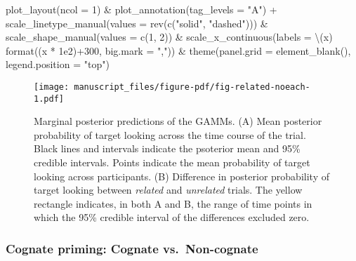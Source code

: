 \documentclass[
  letterpaper,
  DIV=11,
  numbers=noendperiod]{scrartcl}
\newenvironment{Shaded}{\begin{snugshade}}{\end{snugshade}}
\newcommand{\AttributeTok}[1]{\textcolor[rgb]{0.40,0.45,0.13}{#1}}
\newcommand{\DecValTok}[1]{\textcolor[rgb]{0.68,0.00,0.00}{#1}}
\newcommand{\FloatTok}[1]{\textcolor[rgb]{0.68,0.00,0.00}{#1}}
\newcommand{\FunctionTok}[1]{\textcolor[rgb]{0.28,0.35,0.67}{#1}}
\newcommand{\NormalTok}[1]{\textcolor[rgb]{0.00,0.23,0.31}{#1}}
\newcommand{\SpecialCharTok}[1]{\textcolor[rgb]{0.37,0.37,0.37}{#1}}
\newcommand{\StringTok}[1]{\textcolor[rgb]{0.13,0.47,0.30}{#1}}
\begin{document}
\begin{Shaded}
\begin{Highlighting}[]
    \FunctionTok{plot\_layout}\NormalTok{(}\AttributeTok{ncol =} \DecValTok{1}\NormalTok{) }\SpecialCharTok{\&}
    \FunctionTok{plot\_annotation}\NormalTok{(}\AttributeTok{tag\_levels =} \StringTok{"A"}\NormalTok{) }\SpecialCharTok{+}
    \FunctionTok{scale\_linetype\_manual}\NormalTok{(}\AttributeTok{values =} \FunctionTok{rev}\NormalTok{(}\FunctionTok{c}\NormalTok{(}\StringTok{"solid"}\NormalTok{, }\StringTok{"dashed"}\NormalTok{))) }\SpecialCharTok{\&}
    \FunctionTok{scale\_shape\_manual}\NormalTok{(}\AttributeTok{values =} \FunctionTok{c}\NormalTok{(}\DecValTok{1}\NormalTok{, }\DecValTok{2}\NormalTok{)) }\SpecialCharTok{\&}
    \FunctionTok{scale\_x\_continuous}\NormalTok{(}\AttributeTok{labels =}\NormalTok{ \textbackslash{}(x) }\FunctionTok{format}\NormalTok{((x }\SpecialCharTok{*} \FloatTok{1e2}\NormalTok{)}\SpecialCharTok{+}\DecValTok{300}\NormalTok{, }
                                            \AttributeTok{big.mark =} \StringTok{","}\NormalTok{)) }\SpecialCharTok{\&}
    \FunctionTok{theme}\NormalTok{(}\AttributeTok{panel.grid =} \FunctionTok{element\_blank}\NormalTok{(),}
          \AttributeTok{legend.position =} \StringTok{"top"}\NormalTok{) }
\end{Highlighting}
\end{Shaded}

\begin{figure}[H]

{\centering \texttt{[image: manuscript\_files/figure-pdf/fig-related-noeach-1.pdf]}

}

\caption{\label{fig-related-noeach}Marginal posterior predictions of the
GAMMs. (A) Mean posterior probability of target looking across the time
course of the trial. Black lines and intervals indicate the psoterior
mean and 95\% credible intervals. Points indicate the mean probability
of target looking across participants. (B) Difference in posterior
probability of target looking between \emph{related} and
\emph{unrelated} trials. The yellow rectangle indicates, in both A and
B, the range of time points in which the 95\% credible interval of the
differences excluded zero.}

\end{figure}

\hypertarget{cognate-priming-cognate-vs.-non-cognate-3}{%
\subsubsection{Cognate priming: Cognate
vs.~Non-cognate}\label{cognate-priming-cognate-vs.-non-cognate-3}}
\end{document}
